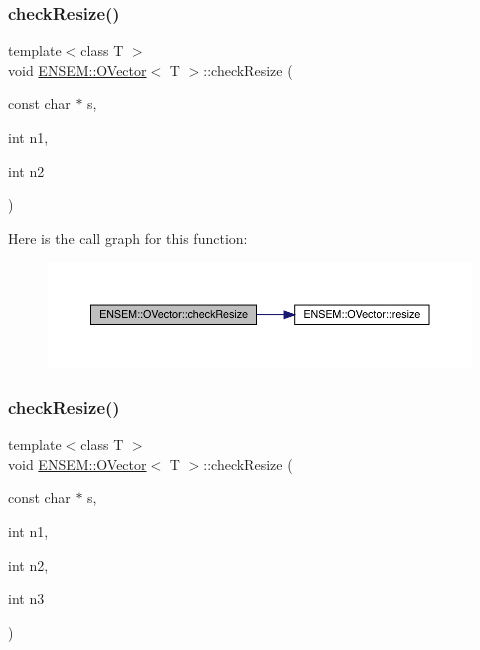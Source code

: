 \subsubsection{\texorpdfstring{checkResize()}{checkResize()}\hspace{0.1cm}{\footnotesize\ttfamily [4/6]}}
{\footnotesize\ttfamily template$<$class T $>$ \\
void \mbox{\hyperlink{classENSEM_1_1OVector}{E\+N\+S\+E\+M\+::\+O\+Vector}}$<$ T $>$\+::check\+Resize (\begin{DoxyParamCaption}\item[{const char $\ast$}]{s,  }\item[{int}]{n1,  }\item[{int}]{n2 }\end{DoxyParamCaption})\hspace{0.3cm}{\ttfamily [inline]}}

Here is the call graph for this function\+:
\nopagebreak
\begin{figure}[H]
\begin{center}
\leavevmode
\includegraphics[width=350pt]{d0/d8d/classENSEM_1_1OVector_acd8960fbc5b7df8aabf14ca8ca50f7ab_cgraph}
\end{center}
\end{figure}
\mbox{\label{classENSEM_1_1OVector_ac909025f6c5d78479f5dcbef8151d571}} 
\subsubsection{\texorpdfstring{checkResize()}{checkResize()}\hspace{0.1cm}{\footnotesize\ttfamily [5/6]}}
{\footnotesize\ttfamily template$<$class T $>$ \\
void \mbox{\hyperlink{classENSEM_1_1OVector}{E\+N\+S\+E\+M\+::\+O\+Vector}}$<$ T $>$\+::check\+Resize (\begin{DoxyParamCaption}\item[{const char $\ast$}]{s,  }\item[{int}]{n1,  }\item[{int}]{n2,  }\item[{int}]{n3 }\end{DoxyParamCaption})\hspace{0.3cm}{\ttfamily [inline]}}

